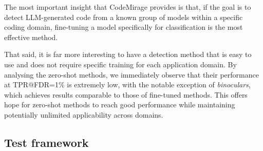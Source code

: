 The most important insight that CodeMirage provides is that, if the 
goal is to detect LLM-generated code from a known group of models 
within a specific coding domain, fine-tuning a model specifically for 
classification is the most effective method.

That said, it is far more interesting to have a detection method that 
is easy to use and does not require specific training for each 
application domain. By analysing the zero-shot methods, we 
immediately observe that their performance at TPR@FDR=1\% is 
extremely low, with the notable exception of \textit{binoculars}, 
which achieves results comparable to those of fine-tuned methods. 
This offers hope for zero-shot methods to reach good performance 
while maintaining potentially unlimited applicability across domains.


\subsection{Test framework}
